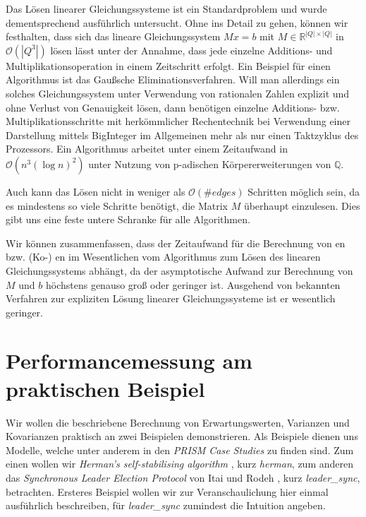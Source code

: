\documentclass[a4paper]{article}
\theoremstyle{nonumberplain}
\begin{document}
Das Lösen linearer Gleichungssysteme ist ein Standardproblem und wurde dementsprechend ausführlich untersucht. Ohne ins Detail zu gehen, können wir festhalten, dass sich das lineare Gleichungssystem $Mx = b$ mit $M \in \mathbb{R}^{|Q|\times|Q|}$  in $\mathcal{O}(|Q^3|)$ lösen lässt unter der Annahme, dass jede einzelne Additions- und Multiplikationsoperation in einem Zeitschritt erfolgt. Ein Beispiel für einen Algorithmus ist das Gaußsche Eliminationsverfahren. Will man allerdings ein solches Gleichungssystem unter Verwendung von rationalen Zahlen explizit und ohne Verlust von Genauigkeit lösen, dann benötigen einzelne Additions- bzw. Multiplikationsschritte mit herkömmlicher Rechentechnik bei Verwendung einer Darstellung mittels BigInteger im Allgemeinen mehr als nur einen Taktzyklus des Prozessors. Ein Algorithmus \cite{Dixon1982} arbeitet unter einem Zeitaufwand in $\mathcal{O}(n^3(\log n)^2)$ unter Nutzung von p-adischen Körper\-er\-wei\-ter\-ung\-en von $\mathbb{Q}$.

Auch kann das Lösen nicht in weniger als $\mathcal{O}(\#edges)$ Schritten möglich sein, da es mindestens so viele Schritte benötigt, die Matrix $M$ überhaupt einzulesen. Dies gibt uns eine feste untere Schranke für alle Algorithmen. 

Wir können zusammenfassen, dass der Zeitaufwand für die Berechnung von \expect{}en bzw. (Ko-) \var{}en im Wesentlichen vom Algorithmus zum Lösen des linearen Gleichungssystems abhängt, da der asymptotische Aufwand zur Berechnung von $M$ und $b$ höchstens genauso groß oder geringer ist. Ausgehend von bekannten Verfahren zur expliziten Lösung linearer Gleichungssysteme ist er wesentlich geringer.


\section{Performancemessung am praktischen Beispiel}

Wir wollen die beschriebene Berechnung von Erwartungswerten, Varianzen und Kovarianzen praktisch an zwei Beispielen demonstrieren. Als Beispiele dienen uns Modelle, welche unter anderem in den \textit{PRISM Case Studies} \cite{PRISMCS} zu finden sind. Zum einen wollen wir \textit{Herman's self-stabilising algorithm} \cite{Her90}, kurz \textit{herman}, zum anderen das \textit{Synchronous Leader Election Protocol} von Itai und Rodeh \cite{IR90}, kurz \textit{leader\_sync}, betrachten. Ersteres Beispiel wollen wir zur Veranschaulichung hier einmal ausführlich beschreiben, für \textit{leader\_sync} zumindest die Intuition angeben.
\end{document}
